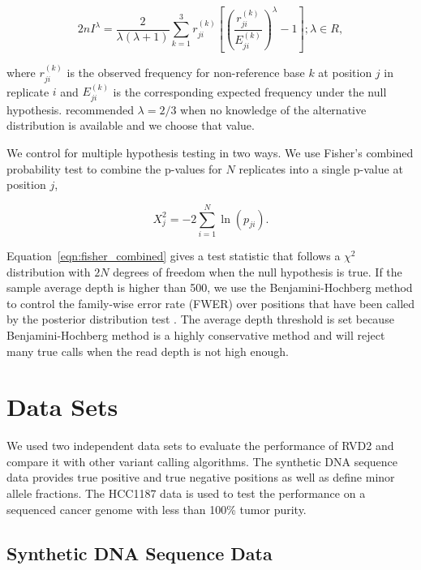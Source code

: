 \documentclass{bioinfo}
\begin{document}
\begin{equation}
 2nI^\lambda = \frac{2}{\lambda(\lambda+1)}\sum_{k=1}^3 r_{ji}^{(k)} \left[\left(\frac{r_{ji}^{(k)}}{E_{ji}^{(k)}}\right)^\lambda-1\right];\lambda \in R,
\end{equation}

where $r_{ji}^{(k)}$ is the observed frequency for non-reference base $k$ at position $j$ in replicate $i$ and $E_{ji}^{(k)}$ is the corresponding expected frequency under the null hypothesis. \citet{cressie1984multinomial} recommended $\lambda = 2/3$ when no knowledge of the alternative distribution is available and we choose that value.

We control for multiple hypothesis testing in two ways. We use Fisher's combined probability test \citep{fisher1970statistical} to combine the p-values for $N$ replicates into a single p-value at position $j$,

\begin{equation}\label{eqn:fisher_combined}
	X_j^2 = -2 \sum_{i=1}^N \ln(p_{ji}).
\end{equation}

Equation~\eqref{eqn:fisher_combined} gives a test statistic that follows a $\chi^2$ distribution with $2N$ degrees of freedom when the null hypothesis is true. If the sample average depth is higher than 500, we use the Benjamini-Hochberg method to control the family-wise error rate (FWER) over positions that have been called by the posterior distribution test \citep{benjamini1995controlling, efron2010large}. The average depth threshold is set because Benjamini-Hochberg method is a highly conservative method and will reject many true calls when the read depth is not high enough.

\section{Data Sets}

We used two independent data sets to evaluate the performance of RVD2 and compare it with other variant calling algorithms. The synthetic DNA sequence data provides true positive and true negative positions as well as define minor allele fractions. The HCC1187 data is used to test the performance on a sequenced cancer genome with less than 100\% tumor purity.

\subsection{Synthetic DNA Sequence Data}
\end{document}
